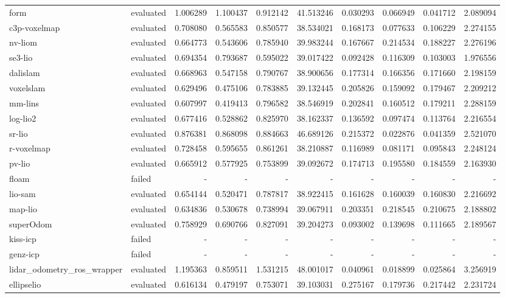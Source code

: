 \documentclass{article}
\begin{document}
\begin{table}[htbp]
\begin{tabular}{llrrrrrrrr}
form & evaluated & 1.006289 & 1.100437 & 0.912142 & 41.513246 & 0.030293 & 0.066949 & 0.041712 & 2.089094 \\
c3p-voxelmap & evaluated & 0.708080 & 0.565583 & 0.850577 & 38.534021 & 0.168173 & 0.077633 & 0.106229 & 2.274155 \\
nv-liom & evaluated & 0.664773 & 0.543606 & 0.785940 & 39.983244 & 0.167667 & 0.214534 & 0.188227 & 2.276196 \\
se3-lio & evaluated & 0.694354 & 0.793687 & 0.595022 & 39.017422 & 0.092428 & 0.116309 & 0.103003 & 1.976556 \\
dalislam & evaluated & 0.668963 & 0.547158 & 0.790767 & 38.900656 & 0.177314 & 0.166356 & 0.171660 & 2.198159 \\
voxelslam & evaluated & 0.629496 & 0.475106 & 0.783885 & 39.132445 & 0.205826 & 0.159092 & 0.179467 & 2.209212 \\
mm-lins & evaluated & 0.607997 & 0.419413 & 0.796582 & 38.546919 & 0.202841 & 0.160512 & 0.179211 & 2.288159 \\
log-lio2 & evaluated & 0.677416 & 0.528862 & 0.825970 & 38.162337 & 0.136592 & 0.097474 & 0.113764 & 2.216554 \\
sr-lio & evaluated & 0.876381 & 0.868098 & 0.884663 & 46.689126 & 0.215372 & 0.022876 & 0.041359 & 2.521070 \\
r-voxelmap & evaluated & 0.728458 & 0.595655 & 0.861261 & 38.210887 & 0.116989 & 0.081171 & 0.095843 & 2.248124 \\
pv-lio & evaluated & 0.665912 & 0.577925 & 0.753899 & 39.092672 & 0.174713 & 0.195580 & 0.184559 & 2.163930 \\
floam & failed & - & - & - & - & - & - & - & - \\
lio-sam & evaluated & 0.654144 & 0.520471 & 0.787817 & 38.922415 & 0.161628 & 0.160039 & 0.160830 & 2.216692 \\
map-lio & evaluated & 0.634836 & 0.530678 & 0.738994 & 39.067911 & 0.203351 & 0.218545 & 0.210675 & 2.188802 \\
superOdom & evaluated & 0.758929 & 0.690766 & 0.827091 & 39.204273 & 0.093002 & 0.139698 & 0.111665 & 2.189567 \\
kiss-icp & failed & - & - & - & - & - & - & - & - \\
genz-icp & failed & - & - & - & - & - & - & - & - \\
lidar\_odometry\_ros\_wrapper & evaluated & 1.195363 & 0.859511 & 1.531215 & 48.001017 & 0.040961 & 0.018899 & 0.025864 & 3.256919 \\
ellipselio & evaluated & 0.616134 & 0.479197 & 0.753071 & 39.103031 & 0.275167 & 0.179736 & 0.217442 & 2.231724 \\

\end{tabular}
\end{table}
\end{document}
